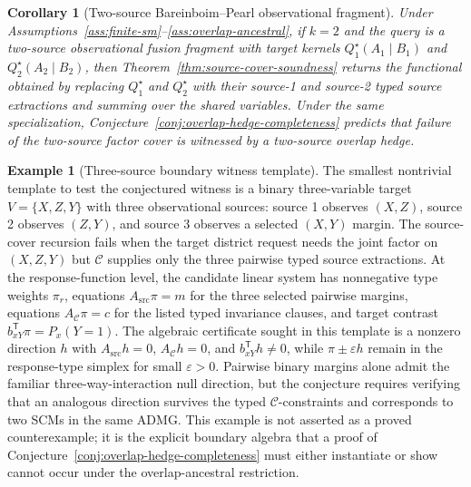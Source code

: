 \documentclass[11pt]{article}
\newcommand{\transpose}{\mathsf{T}}
\theoremstyle{definition}
\newtheorem{example}{Example}
\theoremstyle{plain}
\newtheorem{corollary}{Corollary}
\theoremstyle{remark}
\begin{document}
\begin{corollary}[Two-source Bareinboim--Pearl observational fragment]\label{cor:bp-two-source}
Under Assumptions~\ref{ass:finite-sm}--\ref{ass:overlap-ancestral}, if
\(k=2\) and the query is a two-source observational fusion fragment with
target kernels \(Q_1^\star(A_1\mid B_1)\) and
\(Q_2^\star(A_2\mid B_2)\), then Theorem~\ref{thm:source-cover-soundness}
returns the functional obtained by replacing \(Q_1^\star\) and
\(Q_2^\star\) with their source-1 and source-2 typed source extractions and
summing over the shared variables.  Under the same specialization,
Conjecture~\ref{conj:overlap-hedge-completeness} predicts that failure of the
two-source factor cover is witnessed by a two-source overlap hedge.
\end{corollary}

\begin{example}[Three-source boundary witness template]\label{ex:three-source-template}
The smallest nontrivial template to test the conjectured witness is a binary
three-variable target \(V=\{X,Z,Y\}\) with three observational sources:
source 1 observes \((X,Z)\), source 2 observes \((Z,Y)\), and source 3 observes
a selected \((X,Y)\) margin.  The source-cover recursion fails when the target
district request needs the joint factor on \((X,Z,Y)\) but
\(\mathcal C\) supplies only the three pairwise typed source extractions.  At
the response-function level, the candidate linear system has nonnegative type
weights \(\pi_r\), equations \(A_{\mathrm{src}}\pi=m\) for the three selected
pairwise margins, equations \(A_{\mathcal C}\pi=c\) for the listed typed
invariance clauses, and target contrast \(b_{xY}^{\transpose}\pi=P_x(Y=1)\).
The algebraic certificate sought in this template is a nonzero direction
\(h\) with \(A_{\mathrm{src}}h=0\), \(A_{\mathcal C}h=0\), and
\(b_{xY}^{\transpose}h\ne 0\), while \(\pi\pm\varepsilon h\) remain in the
response-type simplex for small \(\varepsilon>0\).  Pairwise binary margins
alone admit the familiar three-way-interaction null direction, but the
conjecture requires verifying that an analogous direction survives the typed
\(\mathcal C\)-constraints and corresponds to two SCMs in the same ADMG.  This
example is not asserted as a proved counterexample; it is the explicit
boundary algebra that a proof of
Conjecture~\ref{conj:overlap-hedge-completeness} must either instantiate or
show cannot occur under the overlap-ancestral restriction.
\end{example}
\end{document}

